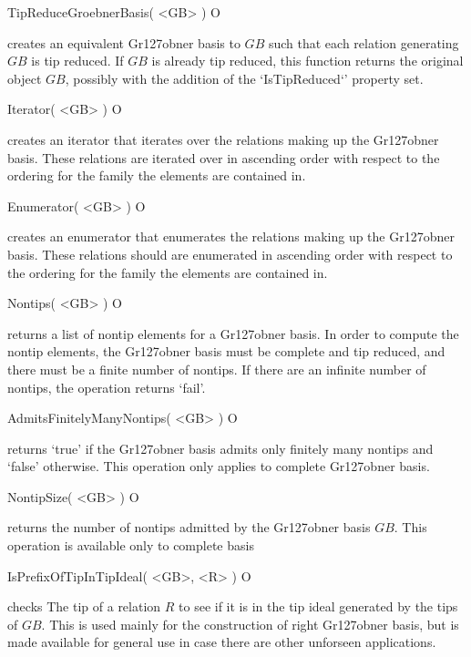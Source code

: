 \>TipReduceGroebnerBasis( <GB> ) O

creates an equivalent Gr\accent127obner basis to $GB$ such that each relation 
generating $GB$ is tip reduced. If $GB$ is already tip reduced, this 
function returns the original object $GB$, possibly with the addition 
of the `IsTipReduced`' property set.

\beginexample 
\endexample


\>Iterator( <GB> ) O

creates an iterator that iterates over the relations making up 
the Gr\accent127obner basis. These relations are iterated over in 
ascending order with respect to the ordering for the
family the elements are contained in.

\beginexample 
\endexample


\>Enumerator( <GB> ) O

creates an enumerator that enumerates the
relations making up the Gr\accent127obner basis. These relations should are
enumerated in ascending order with respect to the ordering for the
family the elements are contained in.

\beginexample 
\endexample


\>Nontips( <GB> ) O

returns a list of nontip elements for a
Gr\accent127obner basis. In order to compute the nontip elements, the
Gr\accent127obner  basis must be complete and tip reduced, and there must be a 
finite number of nontips. If there are an infinite number of nontips,
the operation returns `fail'.

\beginexample 
\endexample


\>AdmitsFinitelyManyNontips( <GB> ) O

returns `true' if the
Gr\accent127obner basis admits only finitely many nontips and `false' 
otherwise. This operation only applies to complete Gr\accent127obner basis.

\beginexample 
\endexample


\>NontipSize( <GB> ) O

returns the number of nontips admitted by 
the Gr\accent127obner basis $GB$. This operation is available only to
complete  basis

\beginexample 
\endexample


\>IsPrefixOfTipInTipIdeal( <GB>, <R> ) O

checks The tip of a relation $R$ to see if it is in the tip ideal 
generated by the tips of $GB$. This is used mainly for the
construction of right Gr\accent127obner basis, but is made available for
general use in case there are other unforseen applications.

